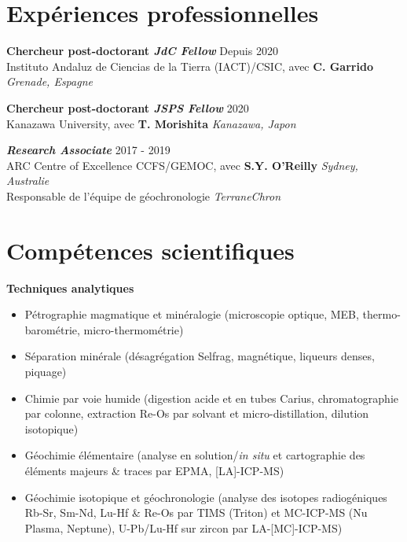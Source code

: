 \documentclass[a4paper,11pt]{article}
\begin{document}
\section{Expériences professionnelles}
    
    \textbf{Chercheur post-doctorant \textit{JdC Fellow}}
    \hfill {Depuis 2020}\\
    Instituto Andaluz de Ciencias de la Tierra (IACT)/CSIC, avec \textbf{C. Garrido}
    \hfill \textit{Grenade, Espagne}
     
    \textbf{Chercheur post-doctorant \textit{JSPS Fellow}}
    \hfill {2020}\\
    Kanazawa University, avec \textbf{T. Morishita}
    \hfill \textit{Kanazawa, Japon}
    
    \textbf{\textit{Research Associate}}
    \hfill {2017 - 2019}\\
    ARC Centre of Excellence CCFS/GEMOC, avec \textbf{S.Y. O'Reilly}
    \hfill \textit{Sydney, Australie}\\
    Responsable de l’équipe de géochronologie \textit{TerraneChron}
    
\section{Compétences scientifiques}

    \textbf{Techniques analytiques} 
    \begin{itemize}[itemsep=0pt,parsep=2pt]
        \item Pétrographie magmatique et minéralogie (microscopie optique, MEB, thermo-barométrie, micro-thermométrie)
        \item Séparation minérale (désagrégation Selfrag, magnétique, liqueurs denses, piquage)
        \item Chimie par voie humide (digestion acide et en tubes Carius, chromatographie par colonne, extraction Re-Os par solvant et micro-distillation, dilution isotopique)
        \item Géochimie élémentaire (analyse en solution/\textit{in situ} et cartographie des éléments majeurs \& traces par EPMA, [LA]-ICP-MS)
        \item Géochimie isotopique et géochronologie (analyse des isotopes radiogéniques Rb-Sr, Sm-Nd, Lu-Hf \& Re-Os par TIMS (Triton) et MC-ICP-MS (Nu Plasma, Neptune), U-Pb/Lu-Hf sur zircon par LA-[MC]-ICP-MS)
    \end{itemize}
    
\end{document}
